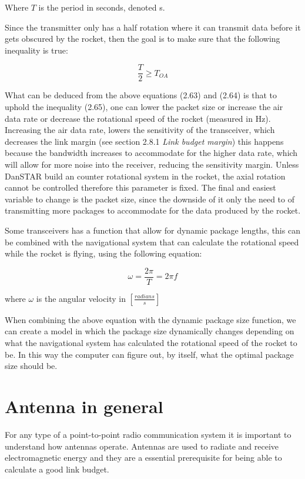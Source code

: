 Where $T$ is the period in seconds, denoted s.

Since the transmitter only has a half rotation where it can transmit data before it gets obscured by the rocket, then the goal is to make sure that the following inequality is true:

\begin{equation}
    \frac{T}{2} \geq T_{OA}
\end{equation}

What can be deduced from the above equations (2.63) and (2.64) is that to uphold the inequality (2.65), one can lower the packet size or increase the air data rate or decrease the rotational speed of the rocket (measured in Hz). Increasing the air data rate, lowers the sensitivity of the transceiver, which decreases the link margin (see section 2.8.1 \textit{Link budget margin}) this happens because the bandwidth increases to accommodate for the higher data rate, which will allow for more noise into the receiver, reducing the sensitivity margin. Unless DanSTAR build an counter rotational system in the rocket, the axial rotation cannot be controlled therefore this parameter is fixed. The final and easiest variable to change is the packet size, since the downside of it only the need to of transmitting more packages to accommodate for the data produced by the rocket. 

Some transceivers has a function that allow for dynamic package lengths, this can be combined with the navigational system that can calculate the rotational speed while the rocket is flying, using the following equation:

\begin{equation}
    \omega = \frac{2\pi}{T} = 2 \pi f
\end{equation}

where $\omega$ is the angular velocity in $[\frac{radians}{s}]$

When combining the above equation with the dynamic package size function, we can create a model in which the package size dynamically changes depending on what the navigational system has calculated the rotational speed of the rocket to be. In this way the computer can figure out, by itself, what the optimal package size should be.

\section{Antenna in general}
For any type of a point-to-point radio communication system it is important to understand how antennas operate. Antennas are used to radiate and receive electromagnetic energy and they are a essential prerequisite for being able to calculate a good link budget.

